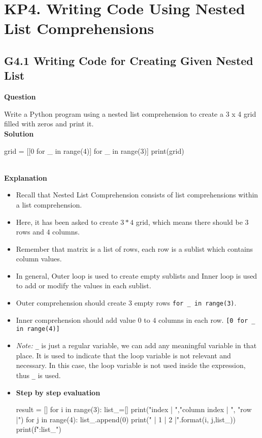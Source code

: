 \documentclass[10pt]{extarticle}
\begin{document}
\section*{KP4. Writing Code Using Nested List Comprehensions}
\subsection*{G4.1 Writing Code for Creating Given Nested List}

\textbf{Question}

Write a Python program using a nested list comprehension to create a 3 x 4 grid filled with zeros and print it. \\

\noindent\textbf{Solution}

\begin{python}
grid = [[0 for _ in range(4)] for _ in range(3)]
print(grid)
\end{python}  \\

\noindent\textbf{Explanation}

\begin{itemize}
    \item Recall that Nested List Comprehension consists of list comprehensions within a list comprehension.
    \item Here, it has been asked to create $ 3*4$ grid, which means there should be $3$ rows and $4$ columns. 
    \item Remember that matrix is a list of rows, each row is a sublist which contains column values.
    \item In general, Outer loop is used to create empty sublists and Inner loop is used to add or modify the values in each sublist. 
    \item Outer comprehension should create $3$ empty rows  \colorbox{gray!20}{\texttt{for \_ in range(3)}}.
    \item Inner comprehension should add value $0$ to $4$ columns in each row.  \colorbox{gray!20}{\texttt{[0 for \_ in range(4)]}} 
    \item \textit{Note:} \texttt{\_} is just a regular variable, we can add any meaningful variable in that place. It is used to indicate that the loop variable is not relevant and necessary. In this case, the loop variable is not used inside the expression, thus \texttt{\_} is used.
    \item \textbf{Step by step evaluation}
    \begin{tcolorbox}[colback=gray!20, colframe=gray!50, sharp corners=southwest]
    \begin{pycode}
result = []
for i in range(3):
  list_=[]
  print("\nrow index | ","column index | ", "row |")
  for j in range(4):
      list_.append(0)
      print("  |  {1}  |  {2}  |".format(i, j,list_))
  print(f"\nRow:{list_}")   

    \end{pycode}
    \end{tcolorbox}
\end{itemize}
\end{document}
